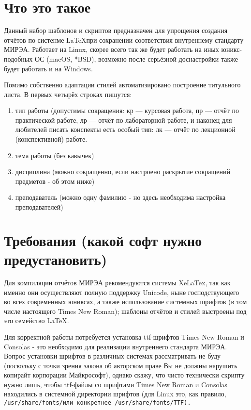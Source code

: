 \documentclass{article}
\begin{document}
\section{Что это такое}
Данный набор шаблонов и скриптов предназначен для упрощения создания отчётов по систенме \LaTeX  при сохранении соответствия внутреннему стандарту МИРЭА. Работает на Linux, скорее всего так же будет работать на иных юникс-подобных ОС (macOS, *BSD), возможно после серьёзной доснастройки также будет работать и на Windows.

Помимо собственно адаптации стилей автоматизировано построение титульного листа. В первых четырёх строках пишутся:
\begin{enumerate}
\item тип работы (допустимы сокращения: кр --- курсовая работа, пр --- отчёт по практической работе, лр --- отчёт по лабораторной работе, и наконец для любителей писать конспекты есть особый тип: лк --- отчёт по лекционной (конспективной) работе.
\item тема работы (без кавычек)
\item дисциплина (можно сокращенно, если настроено раскрытие сокращений предметов - об этом ниже) %
\item преподаватель (можно одну фамилию - но здесь необходима настройка преподавателей) %
\end{enumerate}

\section{Требования (какой софт нужно предустановить)}

Для компиляции отчётов МИРЭА рекомендуются системы XeLaTex, так как именно они осуществляют полную поддержку Unicode, ныне господствующего во всех современных юниксах, а также использование системных шрифтов (в том числе настоящего Times New Roman); шаблоны отчётов и стилей выстроены под это семейство \LaTeX.

Для корректной работы потребуется установка ttf-шрифтов Times New Roman и Consolas - это необходимо для реализации внутреннего стандарта МИРЭА. Вопрос установки шрифтов в различных системах рассматривать не буду (поскольку с точки зрения закона об авторском праве Вы не должны нарушить копирайт корпорации Майкрософт), однако скажу, что чисто технически скрипту нужно лишь, чтобы ttf-файлы со шрифтами Times New Roman и Consolas находились в системной директории шрифтов (для Linux это, как правило, \tt/usr/share/fonts/\rm или конкретнее \tt/usr/share/fonts/TTF\rm).
\end{document}
